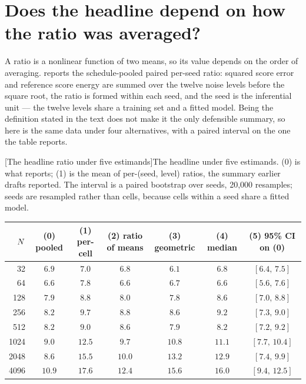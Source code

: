 
\section{Does the headline depend on how the ratio was averaged?}
\label{app:aggregation}

A ratio is a nonlinear function of two means, so its value depends on the order
of averaging. \headlinetable{} reports the schedule-pooled paired
per-seed ratio: squared score error and reference score energy are summed over
the twelve noise levels before the square root, the ratio is formed within each
seed, and the seed is the inferential unit --- the twelve levels share a
training set and a fitted model. Being the definition stated in the text does
not make it the only defensible summary, so here is the same data under four
alternatives, with a paired interval on the one the table reports.

\begin{center}
\begin{minipage}{\linewidth}\small\centering
\setlength{\tabcolsep}{4pt}
[The headline ratio under five estimands]{The headline under five estimands. (0) is what
\headlinetable{} reports; (1) is the mean of per-(seed, level)
ratios, the summary earlier drafts reported. The interval is a paired
bootstrap over seeds, 20,000 resamples; seeds are resampled rather than
cells, because cells within a seed share a fitted model.}
\label{tab:aggregation}
\begin{tabular}{rcccccc}
\toprule
$N$ & (0) pooled & (1) per-cell & (2) ratio of means & (3) geometric & (4) median
        & (5) 95\% CI on (0) \\
\midrule
32 & $6.9$ & $7.0$ & $6.8$ & $6.1$ & $6.8$ & $[6.4,\,7.5]$ \\
64 & $6.6$ & $7.8$ & $6.6$ & $6.7$ & $6.6$ & $[5.6,\,7.6]$ \\
128 & $7.9$ & $8.8$ & $8.0$ & $7.8$ & $8.6$ & $[7.0,\,8.8]$ \\
256 & $8.2$ & $9.7$ & $8.8$ & $8.6$ & $9.2$ & $[7.3,\,9.0]$ \\
512 & $8.2$ & $9.0$ & $8.6$ & $7.9$ & $8.2$ & $[7.2,\,9.2]$ \\
1024 & $9.0$ & $12.5$ & $9.7$ & $10.8$ & $11.1$ & $[7.7,\,10.4]$ \\
2048 & $8.6$ & $15.5$ & $10.0$ & $13.2$ & $12.9$ & $[7.4,\,9.9]$ \\
4096 & $10.9$ & $17.6$ & $12.4$ & $15.6$ & $16.0$ & $[9.4,\,12.5]$ \\
\bottomrule
\end{tabular}
\end{minipage}
\end{center}

